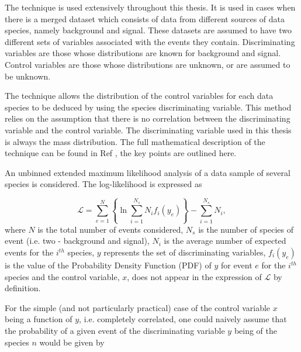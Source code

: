 \label{sec:splot}
The \sPlot technique is used extensively throughout this thesis. It is used in cases when there is a merged dataset which consists of data from different sources of data species, namely background and signal. These datasets are assumed to have two different sets of variables associated with the events they contain. Discriminating variables are those whose distributions are known for background and signal. Control variables are those whose distributions are unknown, or are assumed to be unknown.

The \sPlot technique allows the distribution of the control variables for each data species to be deduced by using the species discriminating variable. This method relies on the assumption that there is no correlation between the discriminating variable and the control variable. The discriminating variable used in this thesis is always the mass distribution. The full mathematical description of the \sPlot technique can be found in Ref \cite{pythia8} %
, the key points are outlined here.

An unbinned extended maximum likelihood analysis of a data sample of several species is considered. The log-likelihood is expressed as

\begin{equation}
  \mathcal{L} = \sum^{N}_{e = 1} \left\{\ln \sum^{N_{s}}_{i = 1} N_{i}f_{i}(y_{e})\right\} - \sum^{N_{s}}_{i = 1}N_{i},
  \label{eq:ll}
\end{equation}
where $N$ is the total number of events considered, $N_{s}$ is the number of species of event (i.e. two - background and signal), $N_{i}$ is the average number of expected events for the $i^{th}$ species, $y$ represents the set of discriminating variables, $f_{i}(y_{e})$ is the value of the Probability Density Function (PDF) of $y$ for event $e$ for the $i^{th}$ species and the control variable, $x$, does not appear in the expression of $\mathcal{L}$ by definition. 

For the simple (and not particularly practical) case of the control variable $x$ being a function of $y$, i.e. completely correlated, one could naively assume that the probability of a given event of the discriminating variable $y$ being of the species $n$ would be given by

